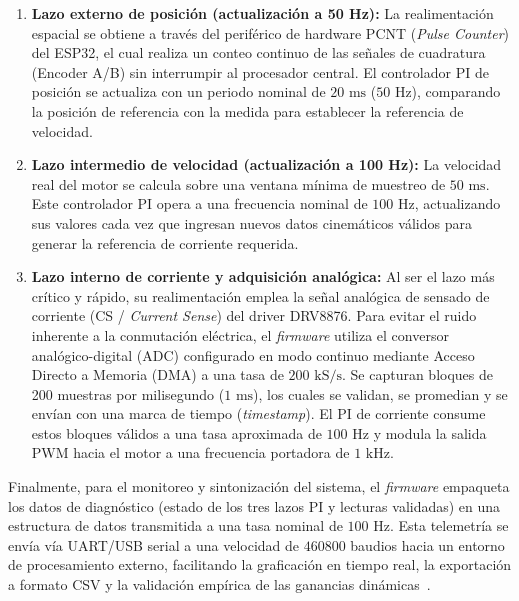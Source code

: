 \begin{enumerate}
    \item \textbf{Lazo externo de posición (actualización a 50 Hz):} La realimentación espacial se obtiene a través del periférico de hardware PCNT (\textit{Pulse Counter}) del ESP32, el cual realiza un conteo continuo de las señales de cuadratura (Encoder A/B) sin interrumpir al procesador central. El controlador PI de posición se actualiza con un periodo nominal de $20\text{ ms}$ ($50\text{ Hz}$), comparando la posición de referencia con la medida para establecer la referencia de velocidad.
    \item \textbf{Lazo intermedio de velocidad (actualización a 100 Hz):} La velocidad real del motor se calcula sobre una ventana mínima de muestreo de $50\text{ ms}$. Este controlador PI opera a una frecuencia nominal de $100\text{ Hz}$, actualizando sus valores cada vez que ingresan nuevos datos cinemáticos válidos para generar la referencia de corriente requerida.
    \item \textbf{Lazo interno de corriente y adquisición analógica:} Al ser el lazo más crítico y rápido, su realimentación emplea la señal analógica de sensado de corriente (CS / \textit{Current Sense}) del driver DRV8876. Para evitar el ruido inherente a la conmutación eléctrica, el \textit{firmware} utiliza el conversor analógico-digital (ADC) configurado en modo continuo mediante Acceso Directo a Memoria (DMA) a una tasa de $200\text{ kS/s}$. Se capturan bloques de 200 muestras por milisegundo ($1\text{ ms}$), los cuales se validan, se promedian y se envían con una marca de tiempo (\textit{timestamp}). El PI de corriente consume estos bloques válidos a una tasa aproximada de $100\text{ Hz}$ y modula la salida PWM hacia el motor a una frecuencia portadora de $1\text{ kHz}$.
\end{enumerate}

Finalmente, para el monitoreo y sintonización del sistema, el \textit{firmware} empaqueta los datos de diagnóstico (estado de los tres lazos PI y lecturas validadas) en una estructura de datos transmitida a una tasa nominal de $100\text{ Hz}$. Esta telemetría se envía vía UART/USB serial a una velocidad de $460800$ baudios hacia un entorno de procesamiento externo, facilitando la graficación en tiempo real, la exportación a formato CSV y la validación empírica de las ganancias dinámicas~\cite{Budai_CascadeControl_2020}.